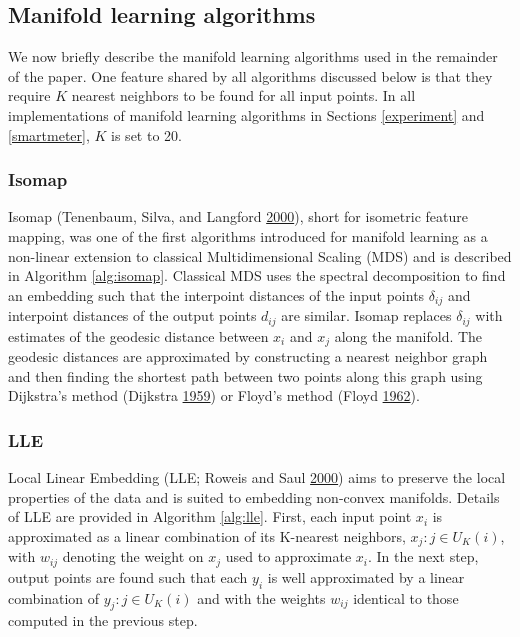 \documentclass[12pt]{article}
\begin{document}
\hypertarget{ml}{%
\subsection{Manifold learning algorithms}\label{ml}}

We now briefly describe the manifold learning algorithms used in the remainder of the paper. One feature shared by all algorithms discussed below is that they require \(K\) nearest neighbors to be found for all input points. In all implementations of manifold learning algorithms in Sections \ref{experiment} and \ref{smartmeter}, \(K\) is set to 20.

\hypertarget{isomap}{%
\subsubsection*{Isomap}\label{isomap}}

Isomap (Tenenbaum, Silva, and Langford \protect\hyperlink{ref-Tenenbaum2000-fr}{2000}), short for isometric feature mapping, was one of the first algorithms introduced for manifold learning as a non-linear extension to classical Multidimensional Scaling (MDS) and is described in Algorithm \ref{alg:isomap}. Classical MDS uses the spectral decomposition to find an embedding such that the interpoint distances of the input points \(\delta_{ij}\) and interpoint distances of the output points \(d_{ij}\) are similar. Isomap replaces \(\delta_{ij}\) with estimates of the geodesic distance between \(x_i\) and \(x_j\) along the manifold. The geodesic distances are approximated by constructing a nearest neighbor graph and then finding the shortest path between two points along this graph using Dijkstra's method (Dijkstra \protect\hyperlink{ref-Dijkstra1959-ml}{1959}) or Floyd's method (Floyd \protect\hyperlink{ref-FloydRobert1962-au}{1962}).

\hypertarget{lle}{%
\subsubsection*{LLE}\label{lle}}

Local Linear Embedding (LLE; Roweis and Saul \protect\hyperlink{ref-Roweis2000-ni}{2000}) aims to preserve the local properties of the data and is suited to embedding non-convex manifolds. Details of LLE are provided in Algorithm \ref{alg:lle}. First, each input point \(x_i\) is approximated as a linear combination of its K-nearest neighbors, \(x_j:j\in U_K(i)\), with \(w_{ij}\) denoting the weight on \(x_j\) used to approximate \(x_i\). In the next step, output points are found such that each \(y_i\) is well approximated by a linear combination of \(y_j:j\in U_K(i)\) and with the weights \(w_{ij}\) identical to those computed in the previous step.
\end{document}
